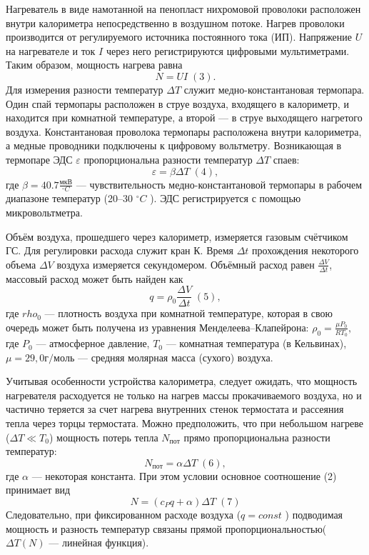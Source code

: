 \documentclass[a4paper,12pt]{article}
\begin{document}
		Нагреватель в виде намотанной на пенопласт нихромовой проволоки расположен внутри калориметра непосредственно в воздушном потоке. Нагрев проволоки производится от регулируемого источника постоянного тока (ИП).
		Напряжение $U$ на нагревателе и ток $I$ через него регистрируются цифровыми мультиметрами. Таким образом, мощность нагрева равна
		$$N= UI \; (3).$$ 
		Для измерения разности температур $\Delta T$ служит медно-константановая
		термопара. Один спай термопары расположен в струе воздуха, входящего в
		калориметр, и находится при комнатной температуре, а второй — в струе выходящего нагретого воздуха. Константановая проволока термопары расположена внутри калориметра, а медные проводники подключены к цифровому вольтметру. Возникающая в термопаре ЭДС $\varepsilon$ пропорциональна разности температур $\Delta T$ спаев: $$\varepsilon =\beta \Delta T \; (4),$$ где $\beta = 40.7 \frac{мкВ}{^\circ C}$ — чувствительность медно-константановой термопары в рабочем диапазоне температур (20–30 $^\circ C$ ). ЭДС регистрируется с помощью микровольтметра.
		
		Объём воздуха, прошедшего через калориметр, измеряется газовым счётчиком ГС. Для регулировки расхода служит кран К. Время $\Delta t$ прохождения
		некоторого объема $\Delta V$ воздуха измеряется секундомером. Объёмный расход равен $\frac{\Delta V}{\Delta t} $, массовый расход может быть найден как $$q = \rho_{0} \frac{\Delta V}{\Delta t} \; (5),$$ где $rho_{0}$ — плотность воздуха при комнатной температуре, которая в свою очередь может быть получена из уравнения Менделеева–Клапейрона: $\rho_{0}= \frac{\mu P_{0} }{R T_{0}},$ где $P_{0}$ — атмосферное давление, $T_{0}$ — комнатная температура (в Кельвинах), $\mu = 29,0 {г/моль}$ — средняя молярная масса (сухого) воздуха.
		
		Учитывая особенности устройства калориметра, следует ожидать, что мощность нагревателя расходуется не только на нагрев массы прокачиваемого воздуха, но и частично теряется за счет нагрева внутренних стенок термостата и рассеяния тепла через торцы термостата. Можно предположить, что при небольшом нагреве ($\Delta T \ll T_{0}$) мощность потерь тепла $N_{пот}$ прямо пропорциональна разности температур:$$ N_{пот} = \alpha \Delta T \; (6),$$ где $\alpha$ — некоторая константа. При этом условии основное соотношение (2) принимает вид $$N = (c_{P}q +\alpha)\Delta T \;(7)$$
		Следовательно, при фиксированном расходе воздуха ($q = const$ ) подводимая мощность и разность температур связаны прямой пропорциональностью($\Delta T(N)$ — линейная функция).
		
\end{document}
